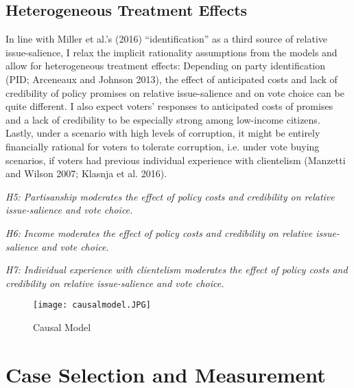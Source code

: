 \documentclass[11pt]{article}
\begin{document}
\subsection{Heterogeneous Treatment Effects}
In line with Miller et al.'s (2016) ``identification'' as a third source of relative issue-salience, I relax the implicit rationality assumptions from the models and allow for heterogeneous treatment effects: Depending on party identification (PID; Arceneaux and Johnson 2013), the effect of anticipated costs and lack of credibility of policy promises on relative issue-salience and on vote choice can be quite different. I also expect voters' responses to anticipated costs of promises and a lack of credibility to be especially strong among low-income citizens. Lastly, under a scenario with high levels of corruption, it might be entirely financially rational for voters to tolerate corruption, i.e. under vote buying scenarios, if voters had previous individual experience with clientelism (Manzetti and Wilson 2007; Klasnja et al. 2016).

\noindent \textit{H5: Partisanship moderates the effect of policy costs and credibility on relative issue-salience and vote choice.}

\noindent \textit{H6: Income moderates the effect of policy costs and credibility on relative issue-salience and vote choice.}

\noindent \textit{H7: Individual experience with clientelism moderates the effect of policy costs and credibility on relative issue-salience and vote choice.}

\begin{figure}[!ht]
\begin{center}
\texttt{[image: causalmodel.JPG]}
\caption{Causal Model}
\label{fig:fig1}
\end{center}
\end{figure}

\newpage
\section{Case Selection and Measurement}
\end{document}
